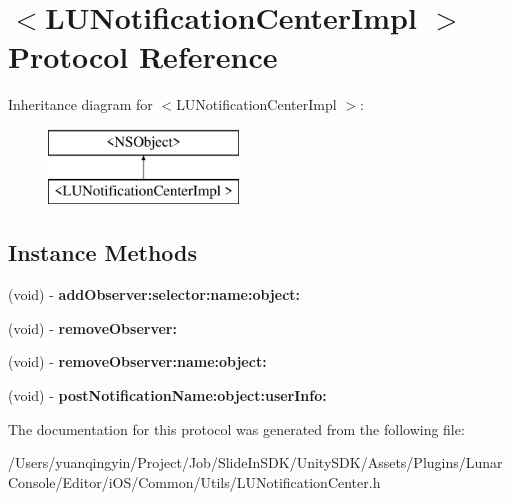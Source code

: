 \hypertarget{protocol_l_u_notification_center_impl_01-p}{}\section{$<$L\+U\+Notification\+Center\+Impl $>$ Protocol Reference}
\label{protocol_l_u_notification_center_impl_01-p}
Inheritance diagram for $<$L\+U\+Notification\+Center\+Impl $>$\+:\begin{figure}[H]
\begin{center}
\leavevmode
\includegraphics[height=2.000000cm]{protocol_l_u_notification_center_impl_01-p}
\end{center}
\end{figure}
\subsection*{Instance Methods}
\begin{DoxyCompactItemize}
\item 
\mbox{\label{protocol_l_u_notification_center_impl_01-p_a53edb40799150dee349a62f72302fb17}} 
(void) -\/ {\bfseries add\+Observer\+:selector\+:name\+:object\+:}
\item 
\mbox{\label{protocol_l_u_notification_center_impl_01-p_a632a293f3adca6ed96729a0df359f088}} 
(void) -\/ {\bfseries remove\+Observer\+:}
\item 
\mbox{\label{protocol_l_u_notification_center_impl_01-p_aafb6129deaa5dfb48bc316c9c25cdda2}} 
(void) -\/ {\bfseries remove\+Observer\+:name\+:object\+:}
\item 
\mbox{\label{protocol_l_u_notification_center_impl_01-p_ada604b9003a84ebad4fe97d7642c820a}} 
(void) -\/ {\bfseries post\+Notification\+Name\+:object\+:user\+Info\+:}
\end{DoxyCompactItemize}


The documentation for this protocol was generated from the following file\+:\begin{DoxyCompactItemize}
\item 
/\+Users/yuanqingyin/\+Project/\+Job/\+Slide\+In\+S\+D\+K/\+Unity\+S\+D\+K/\+Assets/\+Plugins/\+Lunar\+Console/\+Editor/i\+O\+S/\+Common/\+Utils/L\+U\+Notification\+Center.\+h\end{DoxyCompactItemize}
